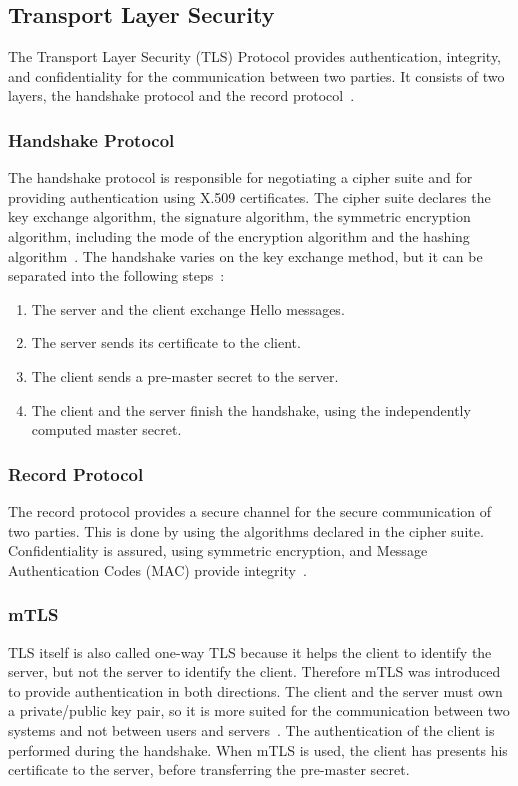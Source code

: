\subsection{Transport Layer Security}
The Transport Layer Security (TLS) Protocol provides authentication, integrity, and confidentiality for the communication between two parties.
It consists of two layers, the handshake protocol and the record protocol~\cite{turnertls}.

\subsubsection{Handshake Protocol}
The handshake protocol is responsible for negotiating a cipher suite and for providing authentication using X.509 certificates.
The cipher suite declares the key exchange algorithm, the signature algorithm, the symmetric encryption algorithm, including the mode of the encryption algorithm and the hashing algorithm~\cite{turnertls, kurbatov2021design}.
The handshake varies on the key exchange method, but it can be separated into the following steps~\cite{krawczyk2013security}:
\begin{enumerate}
    \item The server and the client exchange Hello messages.
    \item The server sends its certificate to the client.
    \item The client sends a pre-master secret to the server.
    \item The client and the server finish the handshake, using the independently computed master secret.
\end{enumerate}

\subsubsection{Record Protocol}
The record protocol provides a secure channel for the secure communication of two parties.
This is done by using the algorithms declared in the cipher suite.
Confidentiality is assured, using symmetric encryption, and Message Authentication Codes (MAC) provide integrity~\cite{kurbatov2021design, krawczyk2013security}.

\subsubsection{mTLS} \label{sec:mtls}
TLS itself is also called one-way TLS because it helps the client to identify the server, but not the server to identify the client.
Therefore mTLS was introduced to provide authentication in both directions.
The client and the server must own a private/public key pair, so it is more suited for the communication between two systems and not between users and servers~\cite{dias2020microservices}. 
The authentication of the client is performed during the handshake.
When mTLS is used, the client has presents his certificate to the server, before transferring the pre-master secret.

